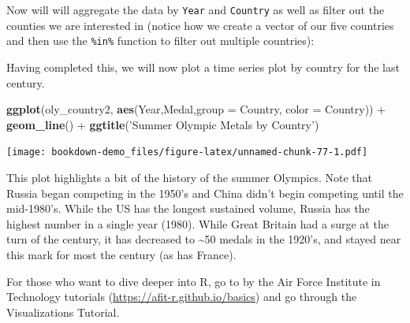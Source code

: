 \documentclass[]{book}
\newenvironment{Shaded}{\begin{snugshade}}{\end{snugshade}}
\newcommand{\KeywordTok}[1]{\textcolor[rgb]{0.13,0.29,0.53}{\textbf{{#1}}}}
\newcommand{\DataTypeTok}[1]{\textcolor[rgb]{0.13,0.29,0.53}{{#1}}}
\newcommand{\StringTok}[1]{\textcolor[rgb]{0.31,0.60,0.02}{{#1}}}
\newcommand{\NormalTok}[1]{{#1}}
\begin{document}
Now will will aggregate the data by \texttt{Year} and \texttt{Country}
as well as filter out the counties we are interested in (notice how we
create a vector of our five countries and then use the \texttt{\%in\%}
function to filter out multiple countries):

\begin{Shaded}
\end{Shaded}

Having completed this, we will now plot a time series plot by country
for the last century.

\begin{Shaded}
\begin{Highlighting}[]
\KeywordTok{ggplot}\NormalTok{(oly_country2, }\KeywordTok{aes}\NormalTok{(Year,Medal,}\DataTypeTok{group =} \NormalTok{Country, }\DataTypeTok{color =} \NormalTok{Country)) +}\StringTok{ }\KeywordTok{geom_line}\NormalTok{() +}\StringTok{ }\KeywordTok{ggtitle}\NormalTok{(}\StringTok{'Summer Olympic Metals by Country'}\NormalTok{)}
\end{Highlighting}
\end{Shaded}

\texttt{[image: bookdown-demo\_files/figure-latex/unnamed-chunk-77-1.pdf]}

This plot highlights a bit of the history of the summer Olympics. Note
that Russia began competing in the 1950's and China didn't begin
competing until the mid-1980's. While the US has the longest sustained
volume, Russia has the highest number in a single year (1980). While
Great Britain had a surge at the turn of the century, it has decreased
to \textasciitilde{}50 medals in the 1920's, and stayed near this mark
for most the century (as has France).

For those who want to dive deeper into R, go to by the Air Force
Institute in Technology tutorials
(\url{https://afit-r.github.io/basics}) and go through the
Visualizations Tutorial.
\end{document}
